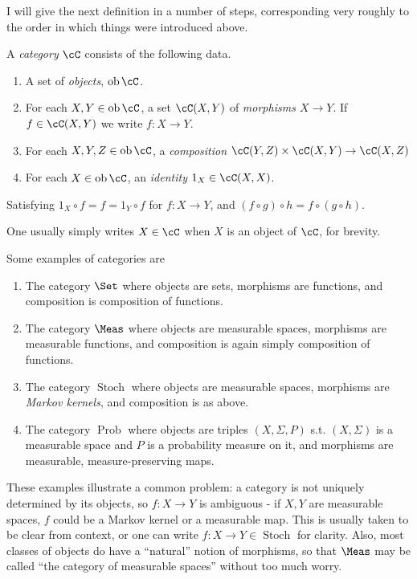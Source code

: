 \documentclass{article}
\DeclareMathOperator{\ob}{ob}
\DeclareMathOperator{\Stoch}{Stoch}
\DeclareMathOperator{\Prob}{Prob}
\begin{document}
I will give the next definition in a number of steps, corresponding very roughly to the order in which things were introduced above.
\begin{definition}
    A \emph{category} $\cC$ consists of the following data.
    \begin{enumerate}
        \item A set of \emph{objects}, $\ob \cC$.
        \item For each $X,Y \in \ob \cC$, a set $\cC(X,Y)$ of \emph{morphisms $X \to Y$}. If $f\in \cC(X,Y)$ we write $f: X \to Y$.
        \item For each $X,Y,Z \in \ob \cC$, a \emph{composition} $\cC(Y,Z) \times \cC(X,Y) \to \cC(X,Z)$
        \item For each $X \in \ob \cC$, an \emph{identity} $1_X \in \cC(X,X)$.
    \end{enumerate}
    Satisfying $1_X \circ f = f = 1_Y \circ f$ for $f: X \to Y$, and $(f\circ g)\circ h = f \circ (g \circ h)$.
\end{definition}
One usually simply writes $X \in \cC$ when $X$ is an object of $\cC$, for brevity.
\begin{example}
    Some examples of categories are
    \begin{enumerate}
        \item The category $\Set$ where objects are sets, morphisms are functions, and composition is composition of functions.
        \item The category $\Meas$ where objects are measurable spaces, morphisms are measurable functions, and composition is again simply composition of functions.
        \item The category $\Stoch$ where objects are measurable spaces, morphisms are \emph{Markov kernels}, and composition is as above.
        \item The category $\Prob$ where objects are triples $(X,\Sigma,P)$ s.t. $(X,\Sigma)$ is a measurable space and $P$ is a probability measure on it, and morphisms are measurable, measure-preserving maps.
    \end{enumerate}
\end{example}
These examples illustrate a common problem: a category is not uniquely determined by its objects, so $f:X \to Y$ is ambiguous - if $X,Y$ are measurable spaces, $f$ could be a Markov kernel or a measurable map. This is usually taken to be clear from context, or one can write $f:X \to Y \in \Stoch$ for clarity.
Also, most classes of objects do have a ``natural'' notion of morphisms, so that $\Meas$ may be called ``the category of measurable spaces'' without too much worry.
\end{document}
